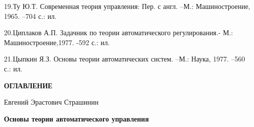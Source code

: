 \documentclass[a4paper]{article}
\begin{document}
{\begin{russian}
\textsf{19.Ту Ю.Т. Современная теория управления: Пер. с англ. –М.: Машиностроение, 1965. –704 с.: ил.}
\end{russian}}

{\begin{russian}\sffamily
20.Циплаков А.П. Задачник по теории автоматического регулирования.- М.: Машиностроение,1977. -592 с.: ил.
\end{russian}}

{\begin{russian}\sffamily
21.Цыпкин Я.З. Основы теории автоматических систем. –М.: Наука, 1977. –560 с.: ил.
\end{russian}}

\clearpage
\bigskip

{\begin{russian}\sffamily\bfseries
ОГЛАВЛЕНИЕ
\end{russian}}


\bigskip

\setcounter{tocdepth}{1}
\renewcommand\contentsname{}
\tableofcontents

\bigskip

\clearpage
\bigskip


\bigskip


\bigskip


\bigskip


\bigskip


\bigskip


\bigskip


\bigskip

{\centering\begin{russian}\sffamily
Евгений Эрастович Страшинин
\end{russian}\par}


\bigskip

{\centering\begin{russian}\sffamily\bfseries
Основы теории автоматического управления
\end{russian}\par}


\bigskip


\bigskip


\bigskip


\bigskip


\bigskip


\bigskip


\bigskip


\bigskip
\end{document}
